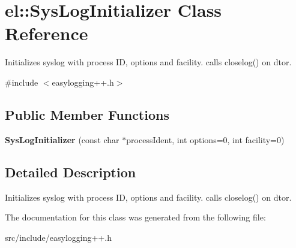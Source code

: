 \hypertarget{classel_1_1_sys_log_initializer}{}\section{el\+:\+:Sys\+Log\+Initializer Class Reference}
\label{classel_1_1_sys_log_initializer}


Initializes syslog with process ID, options and facility. calls closelog() on d\textquotesingle{}tor.  




{\ttfamily \#include $<$easylogging++.\+h$>$}

\subsection*{Public Member Functions}
\begin{DoxyCompactItemize}
\item 
\mbox{\label{classel_1_1_sys_log_initializer_aae71ee83f45c4cf770fbc6c6e87d9406}} 
{\bfseries Sys\+Log\+Initializer} (const char $\ast$process\+Ident, int options=0, int facility=0)
\end{DoxyCompactItemize}


\subsection{Detailed Description}
Initializes syslog with process ID, options and facility. calls closelog() on d\textquotesingle{}tor. 

The documentation for this class was generated from the following file\+:\begin{DoxyCompactItemize}
\item 
src/include/easylogging++.\+h\end{DoxyCompactItemize}
